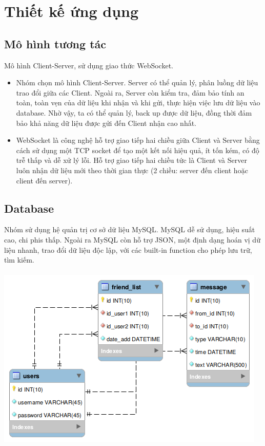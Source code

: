 \documentclass[10pt]{article}
\begin{document}
	\section{Thiết kế ứng dụng}
		\subsection{Mô hình tương tác}
			Mô hình Client-Server, sử dụng giao thức WebSocket.
			\begin{itemize}
				\item Nhóm chọn mô hình Client-Server. Server có thể quản lý, phân luồng dữ liệu trao đổi giữa các Client. Ngoài ra, Server còn kiểm tra, đảm bảo tính an toàn, toàn vẹn của dữ liệu khi nhận và khi gửi, thực hiện việc lưu dữ liệu vào database. Nhờ vậy, ta có thể quản lý, back up được dữ liệu, đồng thời đảm bảo khả năng dữ liệu được gửi đến Client nhận cao nhất.
				\item WebSocket là công nghệ hỗ trợ giao tiếp hai chiều giữa Client và Server bằng cách sử dụng một TCP socket để tạo một kết nối hiệu quả, ít tốn kém, có độ trễ thấp và dễ xử lý lỗi. Hỗ trợ giao tiếp hai chiều tức là Client và Server luôn nhận dữ liệu mới theo thời gian thực (2 chiều: server đến client hoặc client đến server).
			\end{itemize}
		
		\subsection{Database}
			Nhóm sử dụng hệ quản trị cơ sở dữ liệu MySQL. MySQL dễ sử dụng, hiệu suất cao, chi phis thấp. Ngoài ra MySQL còn hỗ trợ JSON, một định dạng hoán vị dữ liệu nhanh, trao đổi dữ liệu độc lập, với các built-in function cho phép lưu trữ, tìm kiếm.\\\\
			\includegraphics{erd.png}
			
\end{document}
